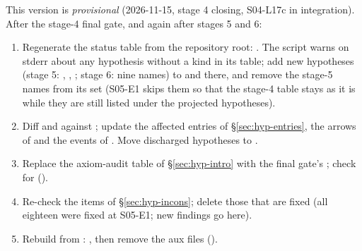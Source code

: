 This version is \emph{provisional} (2026-11-15, stage 4 closing, S04-L17c in integration). After the stage-4 final gate,
and again after stages 5 and 6:
\begin{enumerate}[leftmargin=1.5em]
\item Regenerate the status table from the repository root:
  . The script warns on stderr about any hypothesis without a kind in its
   table; add new hypotheses (stage 5: , , ; stage 6: nine names)
  to  and  there, and remove the stage-5 names from its  set (S05-E1 skips
  them so that the stage-4 table stays as it is while they are still listed under the projected hypotheses).
\item Diff  and  against ; update the
  affected entries of \S\ref{sec:hyp-entries}, the arrows of  and the events of
  . Move discharged hypotheses to \kinddis.
\item Replace the axiom-audit table of \S\ref{sec:hyp-intro} with the final gate's ; check
   for  ().
\item Re-check the items of \S\ref{sec:hyp-incons}; delete those that are fixed (all eighteen were fixed at S05-E1; new findings go here).
\item\sloppy Rebuild from :
  , then remove the aux files
  ().
\end{enumerate}
